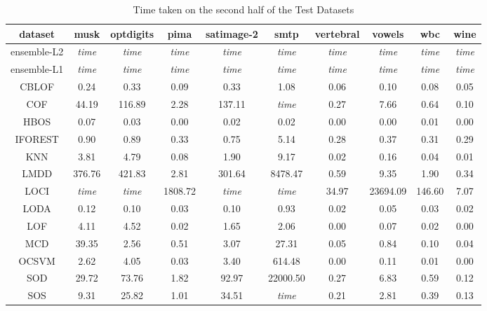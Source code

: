 \begin{table*}[!b]
\renewcommand{\arraystretch}{1.25}
\caption{Time taken on the second half of the Test Datasets}
\label{table:results:test-time-2}
\centering
\begin{tabular}{|c|c|c|c|c|c|c|c|c|c|}
    \hline
    \textbf{dataset} & \textbf{musk} & \textbf{optdigits} & \textbf{pima} & \textbf{satimage-2} & \textbf{smtp} & \textbf{vertebral} & \textbf{vowels} & \textbf{wbc} & \textbf{wine} \\
    \hline
    ensemble-L2 & \textit{time} & \textit{time} & \textit{time} & \textit{time} & \textit{time} & \textit{time} & \textit{time} & \textit{time} & \textit{time} \\
    \hline
    ensemble-L1 & \textit{time} & \textit{time} & \textit{time} & \textit{time} & \textit{time} & \textit{time} & \textit{time} & \textit{time} & \textit{time} \\
    \hline
    CBLOF & 0.24 & 0.33 & 0.09 & 0.33 & 1.08 & 0.06 & 0.10 & 0.08 & 0.05 \\
    \hline
    COF & 44.19 & 116.89 & 2.28 & 137.11 & \textit{time} & 0.27 & 7.66 & 0.64 & 0.10 \\
    \hline
    HBOS & 0.07 & 0.03 & 0.00 & 0.02 & 0.02 & 0.00 & 0.00 & 0.01 & 0.00 \\
    \hline
    IFOREST & 0.90 & 0.89 & 0.33 & 0.75 & 5.14 & 0.28 & 0.37 & 0.31 & 0.29 \\
    \hline
    KNN & 3.81 & 4.79 & 0.08 & 1.90 & 9.17 & 0.02 & 0.16 & 0.04 & 0.01 \\
    \hline
    LMDD & 376.76 & 421.83 & 2.81 & 301.64 & 8478.47 & 0.59 & 9.35 & 1.90 & 0.34 \\
    \hline
    LOCI & \textit{time} & \textit{time} & 1808.72 & \textit{time} & \textit{time} & 34.97 & 23694.09 & 146.60 & 7.07 \\
    \hline
    LODA & 0.12 & 0.10 & 0.03 & 0.10 & 0.93 & 0.02 & 0.05 & 0.03 & 0.02 \\
    \hline
    LOF & 4.11 & 4.52 & 0.02 & 1.65 & 2.06 & 0.00 & 0.07 & 0.02 & 0.00 \\
    \hline
    MCD & 39.35 & 2.56 & 0.51 & 3.07 & 27.31 & 0.05 & 0.84 & 0.10 & 0.04 \\
    \hline
    OCSVM & 2.62 & 4.05 & 0.03 & 3.40 & 614.48 & 0.00 & 0.11 & 0.01 & 0.00 \\
    \hline
    SOD & 29.72 & 73.76 & 1.82 & 92.97 & 22000.50 & 0.27 & 6.83 & 0.59 & 0.12 \\
    \hline
    SOS & 9.31 & 25.82 & 1.01 & 34.51 & \textit{time} & 0.21 & 2.81 & 0.39 & 0.13 \\
    \hline
    \end{tabular}
\end{table*}